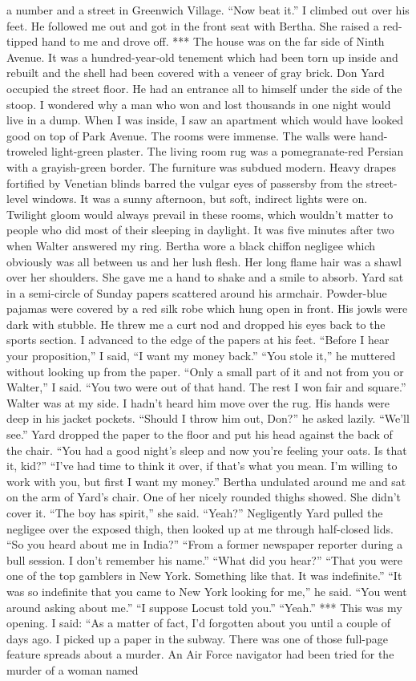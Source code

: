 \documentclass{novel}
\begin{document}
a number and a street in Greenwich Village. “Now beat it.” I climbed out over his feet. He followed me out and got in the front seat with Bertha. She raised a red-tipped hand to me and drove off. *** The house was on the far side of Ninth Avenue. It was a hundred-year-old tenement which had been torn up inside and rebuilt and the shell had been covered with a veneer of gray brick. Don Yard occupied the street floor. He had an entrance all to himself under the side of the stoop. I wondered why a man who won and lost thousands in one night would live in a dump. When I was inside, I saw an apartment which would have looked good on top of Park Avenue. The rooms were immense. The walls were hand-troweled light-green plaster. The living room rug was a pomegranate-red Persian with a grayish-green border. The furniture was subdued modern. Heavy drapes fortified by Venetian blinds barred the vulgar eyes of passersby from the street-level windows. It was a sunny afternoon, but soft, indirect lights were on. Twilight gloom would always prevail in these rooms, which wouldn’t matter to people who did most of their sleeping in daylight. It was five minutes after two when Walter answered my ring. Bertha wore a black chiffon negligee which obviously was all between us and her lush flesh. Her long flame hair was a shawl over her shoulders. She gave me a hand to shake and a smile to absorb. Yard sat in a semi-circle of Sunday papers scattered around his armchair. Powder-blue pajamas were covered by a red silk robe which hung open in front. His jowls were dark with stubble. He threw me a curt nod and dropped his eyes back to the sports section. I advanced to the edge of the papers at his feet. “Before I hear your proposition,” I said, “I want my money back.” “You stole it,” he muttered without looking up from the paper. “Only a small part of it and not from you or Walter,” I said. “You two were out of that hand. The rest I won fair and square.” Walter was at my side. I hadn’t heard him move over the rug. His hands were deep in his jacket pockets. “Should I throw him out, Don?” he asked lazily. “We’ll see.” Yard dropped the paper to the floor and put his head against the back of the chair. “You had a good night’s sleep and now you’re feeling your oats. Is that it, kid?” “I’ve had time to think it over, if that’s what you mean. I’m willing to work with you, but first I want my money.” Bertha undulated around me and sat on the arm of Yard’s chair. One of her nicely rounded thighs showed. She didn’t cover it. “The boy has spirit,” she said. “Yeah?” Negligently Yard pulled the negligee over the exposed thigh, then looked up at me through half-closed lids. “So you heard about me in India?” “From a former newspaper reporter during a bull session. I don’t remember his name.” “What did you hear?” “That you were one of the top gamblers in New York. Something like that. It was indefinite.” “It was so indefinite that you came to New York looking for me,” he said. “You went around asking about me.” “I suppose Locust told you.” “Yeah.” *** This was my opening. I said: “As a matter of fact, I’d forgotten about you until a couple of days ago. I picked up a paper in the subway. There was one of those full-page feature spreads about a murder. An Air Force navigator had been tried for the murder of a woman named 
\end{document}
